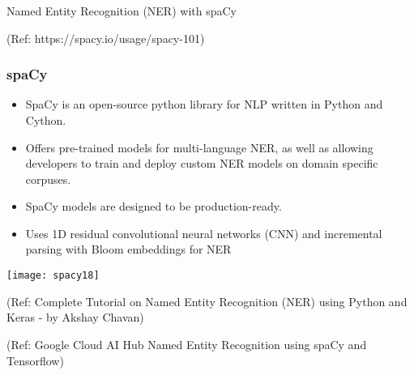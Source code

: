 \begin{frame}[fragile]\frametitle{}

\begin{center}
{\Large Named Entity Recognition (NER) with spaCy}

{\tiny (Ref: https://spacy.io/usage/spacy-101)}

\end{center}


\end{frame}


\begin{frame}[fragile]\frametitle{spaCy}
  \begin{itemize}
  \item SpaCy is an open-source python library for NLP written in Python and Cython. 
	\item Offers pre-trained models for multi-language NER, as well as allowing developers to train and deploy custom NER models on domain specific corpuses. 
	\item SpaCy models are designed to be production-ready.
	\item Uses 1D residual convolutional neural networks (CNN) and incremental parsing with Bloom embeddings for NER
  \end{itemize}
	
\begin{center}
\texttt{[image: spacy18]}

	{\tiny (Ref: Complete Tutorial on Named Entity Recognition (NER) using Python and Keras - by Akshay Chavan)}

\end{center}
	
	{\tiny (Ref: Google Cloud AI Hub Named Entity Recognition using spaCy and Tensorflow)}
\end{frame}

